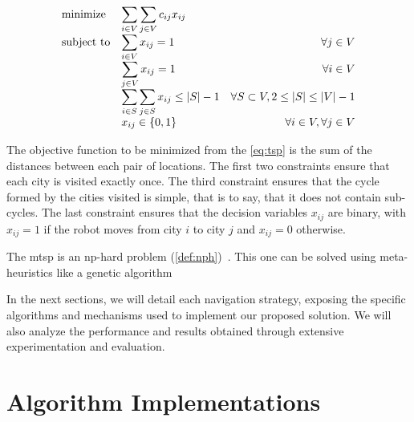 \begin{equation}
	\label{eq:tsp}
	\begin{array}{ll@{}rr}
		\text{minimize} &
		\displaystyle\sum\limits_{i \in V} \sum\limits_{j \in V} c_{ij} x_{ij} &
		&
		\\
		\text{subject to} &
		\displaystyle\sum\limits_{i \in V} x_{ij} = 1 &
		&
		\forall j \in V \\
		&
		\displaystyle\sum\limits_{j \in V} x_{ij} = 1 &
		&
		\forall i \in V \\
		&
		\displaystyle\sum\limits_{i \in S} \sum\limits_{j \in S} x_{ij} \leq |S| - 1 &
		&
		\forall S \subset V, 2 \leq |S| \leq |V| - 1 \\
		&
		x_{ij} \in \{0, 1\} &
		&
		\forall i \in V, \forall j \in V \\
	\end{array}
\end{equation}

The objective function to be minimized from the \ref{eq:tsp} is the sum of the distances between each pair of locations.
The first two constraints ensure that each city is visited exactly once.
The third constraint ensures that the cycle formed by the cities visited is simple, that is to say, that it does not contain sub-cycles.
The last constraint ensures that the decision variables $x_{ij}$ are binary, with $x_{ij} = 1$ if the robot moves from city $i$ to city $j$ and $x_{ij} = 0$ otherwise.

The \gls{mtsp} is an \gls{np}-hard problem (\ref{def:nph})~\cite{SUNDAR201639}.
This one can be solved using meta-heuristics like a genetic algorithm~\cite{SinghMTSP, Kiraly2011}

In the next sections, we will detail each navigation strategy, exposing the specific algorithms and mechanisms used to implement our proposed solution. We will also analyze the performance and results obtained through extensive experimentation and evaluation.

\section{Algorithm Implementations}

